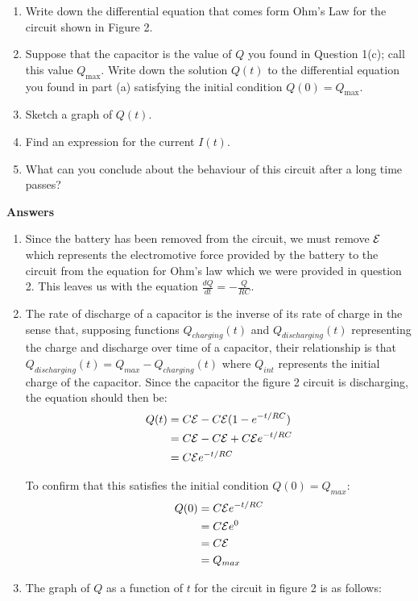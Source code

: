 \documentclass{article}
\begin{document}
\begin{enumerate}
\begin{enumerate}

\item Write down the differential equation that comes form Ohm's Law for the circuit shown in Figure 2.

\item Suppose that the capacitor is the value of $Q$ you found in Question 1(c); call this value $Q_{\max}$. Write down the solution $Q(t)$ to the differential equation you found in part (a) satisfying the initial condition $Q(0) = Q_{\max}$.

\item Sketch a graph of $Q(t)$.

\item Find an expression for the current $I(t)$.  

\item What can you conclude about the behaviour of this circuit after a long time passes?

\end{enumerate}



\color{blue}
\textbf{Answers}
\begin{enumerate}
    \item Since the battery has been removed from the circuit, we must remove $\cal E$ which represents the electromotive force provided by the battery to the circuit from the equation for Ohm's law which we were provided in question 2. This leaves us with the equation $\frac{dQ}{dt} = -\frac{Q}{RC}$.
    \item The rate of discharge of a capacitor is the inverse of its rate of charge in the sense that, supposing functions $Q_{charging}(t)$ and $Q_{discharging}(t)$ representing the charge and discharge over time of a capacitor, their relationship is that $Q_{discharging}(t) = Q_{max} - Q_{charging}(t)$ where $Q_{int}$ represents the initial charge of the capacitor. Since the capacitor the figure 2 circuit is discharging, the equation should then be:
    \begin{align*}
 	Q(t) &= C{\cal E} -  C{\cal E}(1-e^{-t/RC})\\
 	&= C{\cal E} -  C{\cal E} + C{\cal E}e^{-t/RC}\\
 	&=C{\cal E}e^{-t/RC}\\
    \end{align*}
    
    To confirm that this satisfies the initial condition $Q(0) = Q_{max}$:
    \begin{align*}
    Q(0) &= C{\cal E}e^{-t/RC}\\
    &= C{\cal E}e^{0}\\
    &= C{\cal E}\\   
    &= Q_{max} 
    \end{align*}
    \item The graph of $Q$ as a function of $t$ for the circuit in figure 2 is as follows:
    

\end{enumerate}
\end{enumerate}
\end{document}
